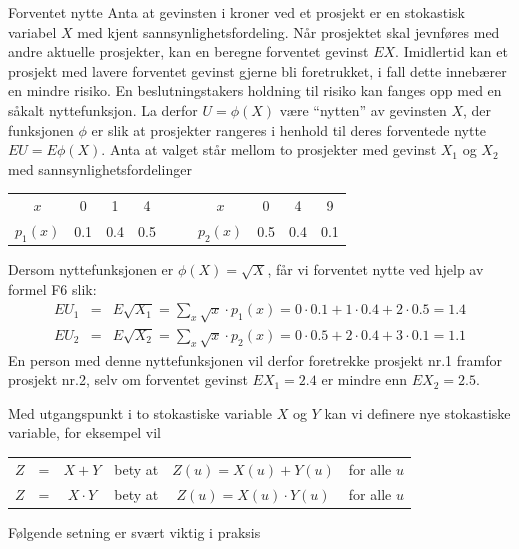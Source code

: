 \begin{eksempel}{Forventet nytte}
Anta at gevinsten i kroner ved et prosjekt er en stokastisk
variabel $X$ med kjent sannsynlighetsfordeling. Når prosjektet
skal jevnføres med andre aktuelle prosjekter, kan en beregne
forventet gevinst $EX$. Imidlertid kan et prosjekt med lavere
forventet gevinst gjerne bli foretrukket, i fall dette innebærer
en mindre risiko. En beslutningstakers holdning til risiko kan
fanges opp med en såkalt nyttefunksjon. La derfor $U=\phi (X)$
være ``nytten'' av gevinsten $X$, der funksjonen $\phi$ er slik
at prosjekter rangeres i henhold til deres forventede nytte
$EU=E\phi (X)$. Anta at valget står mellom to prosjekter med
gevinst $X_1$ og $X_2$ med sannsynlighetsfordelinger
\begin{center}
\begin{tabular}{c|cccccc|ccc}
 $x$& 0 & 1 & 4 & & &$x$& 0 & 4 & 9  \\ \cline{1-4} \cline{7-10}
 $p_1(x)$&0.1&0.4&0.5& & & $p_2(x)$&0.5&0.4&0.1
\end{tabular}
\end{center}
\noindent Dersom nyttefunksjonen er $\phi (X) = \sqrt{X}$, får vi forventet
nytte ved hjelp av formel F6 slik:
\begin{eqnarray*} 
EU_1&=&E\sqrt{X_1}=\sum_{x}\sqrt{x} \cdot p_1(x)=
                     0 \cdot 0.1+ 1 \cdot 0.4+ 2 \cdot 0.5=1.4 \\
EU_2&=&E\sqrt{X_2}=\sum_{x}\sqrt{x} \cdot p_2(x)=
                     0 \cdot 0.5+ 2 \cdot 0.4+ 3 \cdot 0.1=1.1
\end{eqnarray*}
\noindent En person med denne nyttefunksjonen vil derfor foretrekke
prosjekt nr.1 framfor prosjekt nr.2, selv om forventet gevinst $EX_1 =
2.4$ er mindre enn $EX_2 = 2.5$.
\end{eksempel}

Med utgangspunkt i to stokastiske variable $X$ og $Y$ kan vi
definere nye stokastiske variable, for eksempel vil
\begin{center}
 \begin{tabular}{cccccc}
     $Z$&=&$X+Y$    &  bety at& $Z(u)=X(u)+Y(u)$   &    for alle $u$ \\ 
     $Z$&=&$X\cdot Y$ & bety at& $Z(u)=X(u)\cdot Y(u)$&  for alle $u$ 
\end{tabular}
\end{center}
\noindent Følgende setning er svært viktig i praksis

